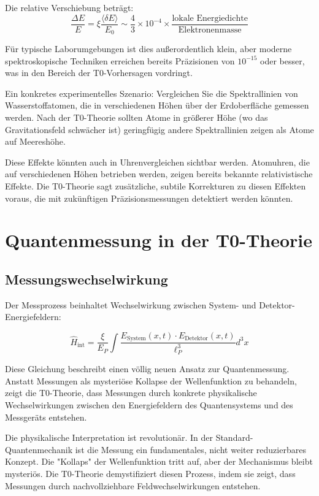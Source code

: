 \documentclass[12pt,a4paper]{article}
\newcommand{\deltaE}{\delta E}
\newcommand{\xipar}{\xi}
\newcommand{\EPlanck}{E_P}
\theoremstyle{definition}
\theoremstyle{remark}
\begin{document}
Die relative Verschiebung beträgt:
$$\frac{\Delta E}{E} = \xipar \frac{\langle \deltaE \rangle}{E_0} \sim \frac{4}{3} \times 10^{-4} \times \frac{\text{lokale Energiedichte}}{\text{Elektronenmasse}}$$

Für typische Laborumgebungen ist dies außerordentlich klein, aber moderne spektroskopische Techniken erreichen bereits Präzisionen von $10^{-15}$ oder besser, was in den Bereich der T0-Vorhersagen vordringt.

Ein konkretes experimentelles Szenario: Vergleichen Sie die Spektrallinien von Wasserstoffatomen, die in verschiedenen Höhen über der Erdoberfläche gemessen werden. Nach der T0-Theorie sollten Atome in größerer Höhe (wo das Gravitationsfeld schwächer ist) geringfügig andere Spektrallinien zeigen als Atome auf Meereshöhe.

Diese Effekte könnten auch in Uhrenvergleichen sichtbar werden. Atomuhren, die auf verschiedenen Höhen betrieben werden, zeigen bereits bekannte relativistische Effekte. Die T0-Theorie sagt zusätzliche, subtile Korrekturen zu diesen Effekten voraus, die mit zukünftigen Präzisionsmessungen detektiert werden könnten.

\section{Quantenmessung in der T0-Theorie}

\subsection{Messungswechselwirkung}

Der Messprozess beinhaltet Wechselwirkung zwischen System- und Detektor-Energiefeldern:

\begin{equation}
	\hat{H}_{\text{int}} = \frac{\xipar}{\EPlanck} \int \frac{E_{\text{System}}(x,t) \cdot E_{\text{Detektor}}(x,t)}{\ell_P^3} d^3x
	\label{eq:measurement_interaction}
\end{equation}

Diese Gleichung beschreibt einen völlig neuen Ansatz zur Quantenmessung. Anstatt Messungen als mysteriöse Kollapse der Wellenfunktion zu behandeln, zeigt die T0-Theorie, dass Messungen durch konkrete physikalische Wechselwirkungen zwischen den Energiefeldern des Quantensystems und des Messgeräts entstehen.

Die physikalische Interpretation ist revolutionär. In der Standard-Quantenmechanik ist die Messung ein fundamentales, nicht weiter reduzierbares Konzept. Die "Kollaps" der Wellenfunktion tritt auf, aber der Mechanismus bleibt mysteriös. Die T0-Theorie demystifiziert diesen Prozess, indem sie zeigt, dass Messungen durch nachvollziehbare Feldwechselwirkungen entstehen.
\end{document}
